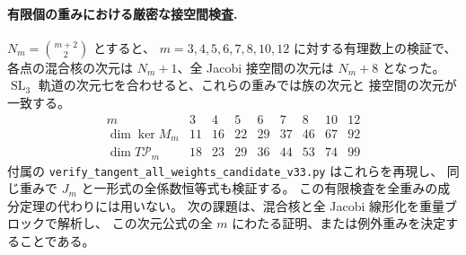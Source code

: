 \paragraph{有限個の重みにおける厳密な接空間検査.}
$N_m=\binom{m+2}{2}$ とすると、
$m=3,4,5,6,7,8,10,12$ に対する有理数上の検証で、各点の混合核の次元は
$N_m+1$、全 Jacobi 接空間の次元は $N_m+8$ となった。
$\operatorname{SL}_3$ 軌道の次元七を合わせると、これらの重みでは族の次元と
接空間の次元が一致する。
\[
\begin{array}{c|rrrrrrrr}
m&3&4&5&6&7&8&10&12\\\hline
\dim\ker M_m&11&16&22&29&37&46&67&92\\
\dim T\mathscr P_m&18&23&29&36&44&53&74&99
\end{array}
\]
付属の \texttt{verify\_tangent\_all\_weights\_candidate\_v33.py} はこれらを再現し、
同じ重みで $J_m$ と一形式の全係数恒等式も検証する。
この有限検査を全重みの成分定理の代わりには用いない。
次の課題は、混合核と全 Jacobi 線形化を重量ブロックで解析し、
この次元公式の全 $m$ にわたる証明、または例外重みを決定することである。
